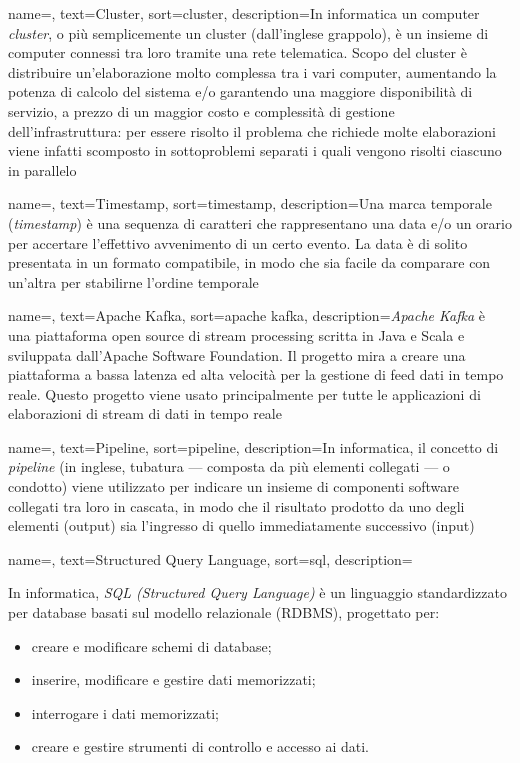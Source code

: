 {
    name=,
    text=Cluster,
    sort=cluster,
    description={In informatica un computer \textit{cluster}, o più semplicemente un cluster (dall'inglese grappolo), è un insieme di computer connessi tra loro tramite una rete telematica. Scopo del cluster è distribuire un'elaborazione molto complessa tra i vari computer, aumentando la potenza di calcolo del sistema e/o garantendo una maggiore disponibilità di servizio, a prezzo di un maggior costo e complessità di gestione dell'infrastruttura: per essere risolto il problema che richiede molte elaborazioni viene infatti scomposto in sottoproblemi separati i quali vengono risolti ciascuno in parallelo}
}

{
    name=,
    text=Timestamp,
    sort=timestamp,
    description={Una marca temporale (\textit{timestamp}) è una sequenza di caratteri che rappresentano una data e/o un orario per accertare l'effettivo avvenimento di un certo evento. La data è di solito presentata in un formato compatibile, in modo che sia facile da comparare con un'altra per stabilirne l'ordine temporale}
}

{
    name=,
    text=Apache Kafka,
    sort=apache kafka,
    description={\textit{Apache Kafka} è una piattaforma open source di stream processing scritta in Java e Scala e sviluppata dall'Apache Software Foundation. Il progetto mira a creare una piattaforma a bassa latenza ed alta velocità per la gestione di feed dati in tempo reale. Questo progetto viene usato principalmente per tutte le applicazioni di elaborazioni di stream di dati in tempo reale}
}

{
    name=,
    text=Pipeline,
    sort=pipeline,
    description={In informatica, il concetto di \textit{pipeline} (in inglese, tubatura — composta da più elementi collegati — o condotto) viene utilizzato per indicare un insieme di componenti software collegati tra loro in cascata, in modo che il risultato prodotto da uno degli elementi (output) sia l'ingresso di quello immediatamente successivo (input)}
}

{
    name=,
    text=Structured Query Language,
    sort=sql,
    description={In informatica, \textit{SQL (Structured Query Language)} è un linguaggio standardizzato per database basati sul modello relazionale (RDBMS), progettato per:
    \begin{itemize}
    	\item{creare e modificare schemi di database;}
    	\item{inserire, modificare e gestire dati memorizzati;}
    	\item{interrogare i dati memorizzati;}
    	\item{creare e gestire strumenti di controllo e accesso ai dati.}
    \end{itemize}
    }
}

